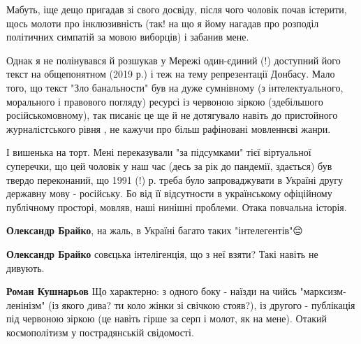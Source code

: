 \begin{itemize}
Мабуть, іще дещо пригадав зі свого досвіду, після чого чоловік почав істерити,
щось молоти про інклюзивність (так! на що я йому нагадав про розподіл
політичних симпатій за мовою виборців) і забанив мене. 

Однак я не полінувався й розшукав у Мережі один-єдиний (!) доступний його текст
на общепонятном (2019 р.) і теж на тему репрезентації Донбасу. Мало того, що
текст "Зло банальности" був на дуже сумнівному (з інтелектуального, морального
і правового погляду) ресурсі із червоною зіркою (здебільшого російськомовному),
так писаніє це ще й не дотягувало навіть до пристойного журналістського рівня ,
не кажучи про більш рафіновані мовленнєві жанри. 

І вишенька на торт. Мені переказували "за підсумками" тієї віртуальної
суперечки, що цей чоловік у наш час (десь за рік до пандемії, здається) був
твердо переконаний, що 1991 (!) р. треба було запроваджувати в Україні другу
державну мову - російську. Бо від її відсутности в українському офіційному
публічному просторі, мовляв, наші нинішні проблеми.  Отака повчальна історія.

\begin{itemize}
 
\textbf{Олександр Брайко}, на жаль, в Україні багато таких "інтелегентів"😔

 
\textbf{Олександр Брайко} совєцька інтелігенція, що з неї взяти? Такі навіть не дивують.

 
\textbf{Роман Кушнарьов} Що характерно: з одного боку - наїзди на чийсь
"марксизм-ленінізм" (із якого дива? ти коло жінки зі свічкою стояв?), із
другого - публікація під червоною зіркою (це навіть гірше за серп і молот, як
на мене). Отакий космополітизм у пострадянській свідомості.


\end{itemize}
\end{itemize}
